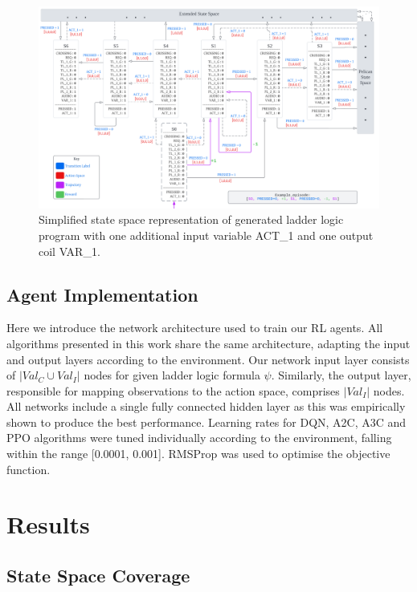 \documentclass[runningheads]{llncs}
\begin{document}
\begin{figure}[!t]
	\centering
	\includegraphics[width=\linewidth]{figs/pelican_states.png}
	\caption{Simplified state space representation of generated ladder logic program with one additional input variable ACT\_1 and one output coil VAR\_1.}
	\label{fig:state_space}
\end{figure}

\subsection{Agent Implementation}
Here we introduce the network architecture used to train our RL agents. All algorithms presented in this work share the same architecture, adapting the input and output layers according to the environment. Our network input layer consists of $|Val_C \cup Val_I|$ nodes for given ladder logic formula $\psi$. Similarly, the output layer, responsible for mapping observations to the action space, comprises $|Val_I|$ nodes. All networks include a single fully connected hidden layer as this was empirically shown to produce the best performance. Learning rates for DQN, A2C, A3C and PPO algorithms were tuned individually according to the environment, falling within the range [0.0001, 0.001]. RMSProp was used to optimise the objective function. 

\section{Results}\label{sec:results}
\subsection{State Space Coverage}
\end{document}

